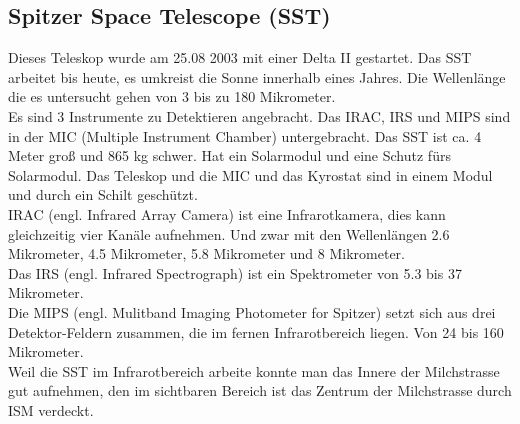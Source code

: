 \subsection{Spitzer Space Telescope (SST)}
Dieses Teleskop wurde am 25.08 2003 mit einer Delta II gestartet. Das SST arbeitet bis heute, es umkreist die Sonne innerhalb eines Jahres. Die Wellenlänge die es untersucht gehen von 3 bis zu 180 Mikrometer. \\
Es sind 3 Instrumente zu Detektieren angebracht. Das IRAC, IRS und MIPS sind in der MIC (Multiple Instrument Chamber) untergebracht. Das SST ist ca. 4 Meter groß und 865 kg schwer. Hat ein Solarmodul und eine Schutz fürs Solarmodul. Das Teleskop und die MIC und das Kyrostat sind in einem Modul und durch ein Schilt geschützt. \\
IRAC (engl. Infrared Array Camera) ist eine Infrarotkamera, dies kann gleichzeitig vier Kanäle aufnehmen. Und zwar mit den Wellenlängen 2.6 Mikrometer, 4.5 Mikrometer, 5.8 Mikrometer und 8 Mikrometer.\\
Das IRS (engl. Infrared Spectrograph) ist ein Spektrometer von 5.3 bis 37 Mikrometer.\\
Die MIPS (engl. Mulitband Imaging Photometer for Spitzer) setzt sich aus drei Detektor-Feldern zusammen, die im fernen Infrarotbereich liegen. Von 24 bis 160 Mikrometer.\\
Weil die SST im Infrarotbereich arbeite konnte man das Innere der Milchstrasse gut aufnehmen, den im sichtbaren Bereich ist das Zentrum der Milchstrasse durch ISM verdeckt.
